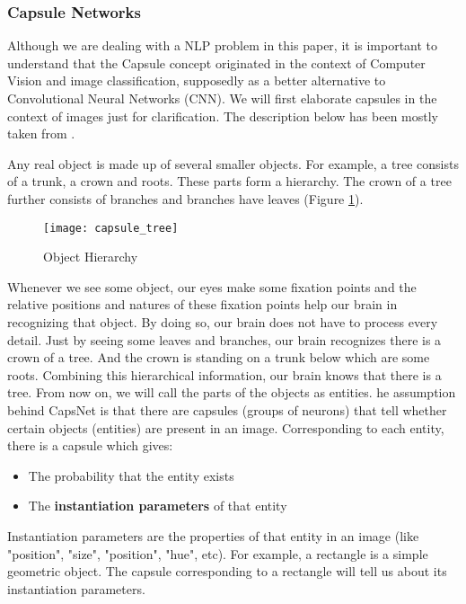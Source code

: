 \documentclass[11pt,twocolumn,letterpaper]{article}
\begin{document}
\subsubsection{Capsule Networks}
Although we are dealing with a NLP problem in this paper, it is important to understand that the Capsule concept originated in the context of Computer Vision and image classification, supposedly as a better alternative to Convolutional Neural Networks (CNN). We will first elaborate capsules in the context of images just for clarification. The description below has been mostly taken from \cite{capsule4}.

Any real object is made up of several smaller objects. For example, a tree consists of a trunk, a crown and roots. These parts form a hierarchy. The crown of a tree further consists of branches and branches have leaves (Figure \ref{fig:capsule_tree}). 

\begin{figure}[h]
\texttt{[image: capsule\_tree]}
\caption{Object Hierarchy}
\label{fig:capsule_tree}
\centering
\end{figure}

Whenever we see some object, our eyes make some fixation points and the relative positions and natures of these fixation points help our brain in recognizing that object. By doing so, our brain does not have to process every detail. Just by seeing some leaves and branches, our brain recognizes there is a crown of a tree. And the crown is standing on a trunk below which are some roots. Combining this hierarchical information, our brain knows that there is a tree. From now on, we will call the parts of the objects as entities. 
he assumption behind CapsNet is that there are capsules (groups of neurons) that tell whether certain objects (entities) are present in an image. Corresponding to each entity, there is a capsule which gives:

\begin{itemize}
  \item The probability that the entity exists
  \item The \textbf{instantiation parameters} of that entity
\end{itemize}

Instantiation parameters are the properties of that entity in an image (like "position", "size", "position", "hue", etc). For example, a rectangle is a simple geometric object. The capsule corresponding to a rectangle will tell us about its instantiation parameters. 
\end{document}
